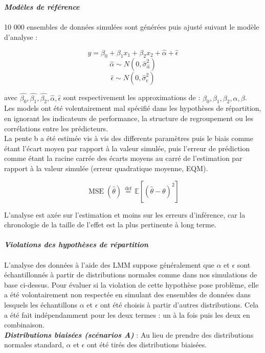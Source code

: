 \documentclass{article}
\begin{document}
\textbf{\textit{Modèles de référence}} \\
\\
10 000 ensembles de données simulées sont générées puis ajusté suivant le modèle d'analyse :

$$ y=\beta_0+\beta_1 x_1+\beta_2x_2+\hat{\alpha}+\hat{\epsilon}  $$
$$ \hat{\alpha} \sim  N(0,\hat{\sigma}^2_{\hat{\alpha}}) $$
$$ \hat{\epsilon} \sim  N(0,\hat{\sigma}^2_{\hat{\epsilon}}) $$

avec $\hat{\beta_0},\hat{\beta_1},\hat{\beta_2},\hat{\alpha},\hat{\epsilon}$     sont respectivement les approximations de :  $\beta_0,\beta_1,\beta_2,\alpha,\beta$. \\
Les models ont été volentairement mal spécifié dans les hypothèses de répartition, en ignorant les indicateurs de performance, la structure de regroupement ou les corrélations entre les prédicteurs. \\
 La pente b a été estimée  vis à vis des differents paramètres puis le biais  comme étant l'écart moyen par rapport à la valeur simulée, puis l'erreur de prédiction comme étant la racine carrée des écarts moyens au carré de l'estimation par rapport à la valeur simulée (erreur quadratique moyenne, EQM). 

$${\displaystyle \operatorname {MSE} ({\hat {\theta }})\,{\overset {\text{def}}{=}}\,\mathbb {E} \left[({\hat {\theta }}-\theta )^{2}\right]}$$


L’analyse est axée sur l'estimation et moins sur les erreurs d'inférence, car la chronologie de la taille de l'effet est la plus pertinente à long terme. 
\\ \\
\textit{\textbf{Violations des hypothèses de répartition}} \\  \\
L'analyse des données à l'aide des LMM suppose généralement que $\alpha$ et $\epsilon$ sont échantillonnés à partir de distributions normales comme dans nos simulations de base ci-dessus. Pour évaluer si la violation de cette hypothèse pose problème, elle a été volontairement non respectée en simulant des ensembles de données dans lesquels les échantillons  $\alpha$ et $\epsilon$ ont été choisis à partir d'autres distributions. Cela a été fait indépendamment pour les deux termes :  un à la fois puis les deux en combinaison. \\
 
 \textbf{\textit{Distributions biaisées (scénarios A)}} : Au lieu de prendre des distributions normales standard,  $\alpha$ et $\epsilon$ ont été tirés des distributions biaisées.
\\ \\
\end{document}
